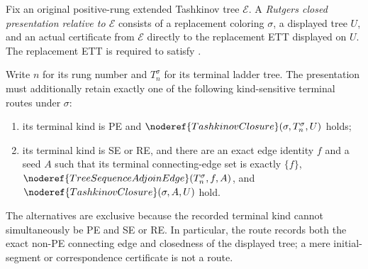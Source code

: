 \begin{definition}
Fix an original positive-rung extended Tashkinov tree \(\mathcal E\).
A \emph{Rutgers closed presentation relative to \(\mathcal E\)} consists
of a replacement coloring \(\sigma\), a displayed tree \(U\), and an
actual  certificate from
\(\mathcal E\) directly to the replacement ETT displayed on \(U\).  The
replacement ETT is required to satisfy .

Write \(n\) for its rung number and \(T_n^\sigma\) for its terminal
ladder tree.  The presentation must additionally retain exactly one of
the following kind-sensitive terminal routes under \(\sigma\):
\begin{enumerate}
\item its terminal kind is PE and
  \(\noderef{TashkinovClosure}(\sigma,T_n^\sigma,U)\) holds;
\item its terminal kind is SE or RE, and there are an exact edge identity
  \(f\) and a seed \(A\) such that its terminal connecting-edge set is
  exactly \(\{f\}\),
  \(\noderef{TreeSequenceAdjoinEdge}(T_n^\sigma,f,A)\), and
  \(\noderef{TashkinovClosure}(\sigma,A,U)\) hold.
\end{enumerate}
The alternatives are exclusive because the recorded terminal kind cannot
simultaneously be PE and SE or RE.  In particular, the route records both
the exact non-PE connecting edge and closedness of the displayed tree; a
mere initial-segment or correspondence certificate is not a route.
\end{definition}
